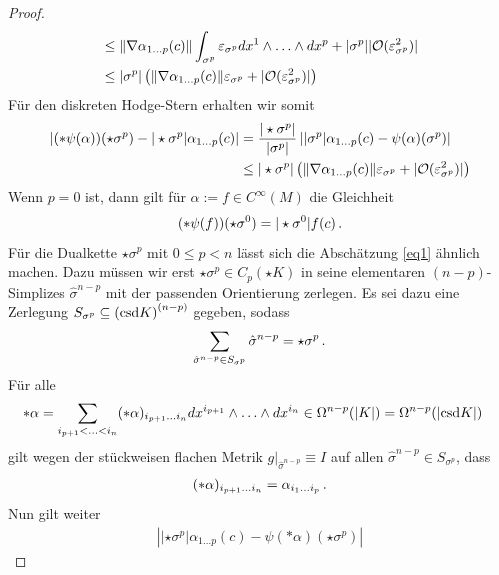 \begin{proof}
\begin{align}
      &\le \|\nabla\alpha_{1 \ldots p}(c)\| \int_{\sigma^{p}} \varepsilon_{\sigma^{p}}  dx^{1}\wedge\ldots\wedge dx^{p} +|\sigma^{p}| |\mathcal{O}(\varepsilon_{\sigma^{p}}^{2})| \\
      &\le |\sigma^{p}| \left( \|\nabla\alpha_{1 \ldots p}(c)\| \varepsilon_{\sigma^{p}} + |\mathcal{O}(\varepsilon_{\sigma^{p}}^{2})| \right) \label{eq1}
    \end{align}
    Für den diskreten Hodge-Stern erhalten wir somit
    \begin{align}
      \left| (*\psi(\alpha))(\star\sigma^{p}) - |\star\sigma^{p}|\alpha_{1 \ldots p}(c) \right|
            &= \frac{|\star\sigma^{p}|}{|\sigma^{p}|} \left| |\sigma^{p}|\alpha_{1 \ldots p}(c) - \psi(\alpha)(\sigma^{p}) \right| \\
            &\le  |\star\sigma^{p}| \left( \|\nabla\alpha_{1 \ldots p}(c)\| \varepsilon_{\sigma^{p}} + |\mathcal{O}(\varepsilon_{\sigma^{p}}^{2})| \right)
    \end{align}
    Wenn \( p = 0 \) ist, dann gilt für \( \alpha:= f \in C^{\infty}(M) \) die Gleichheit
    \begin{align}
      (*\psi(f))(\star\sigma^{0}) = |\star\sigma^{0}|f(c) \,\text{.}
    \end{align}
    Für die Dualkette \( \star\sigma^{p} \) mit \( 0\le p < n \) lässt sich die Abschätzung \eqref{eq1} ähnlich machen.
    Dazu müssen wir erst \( \star\sigma^{p}\in C_{p}(\star K) \) in seine elementaren \( (n-p) \)-Simplizes \( \hat\sigma^{n-p} \) mit der passenden Orientierung zerlegen.
    Es sei dazu eine Zerlegung \(  S_{\sigma^{p}} \subseteq \left( \text{csd} K \right)^{(n-p)} \) gegeben, sodass
    \begin{align}
      \sum_{\hat\sigma^{n-p} \in S_{\sigma^{p}}} \hat\sigma^{n-p} = \star\sigma^{p}
      \,\text{.}
    \end{align}
    Für alle
    \begin{align}
      *\alpha&= \sum_{i_{p+1}<\ldots<i_{n}} (*\alpha)_{i_{p+1}\ldots i_{n}} dx^{i_{p+1}}\wedge\ldots\wedge dx^{i_{n}} \in\Omega^{n-p}(|K|)=\Omega^{n-p}(|\text{csd} K|)
    \end{align}
    gilt wegen der stückweisen flachen Metrik \( g|_{\hat\sigma^{n-p}} \equiv I \) auf allen \( \hat\sigma^{n-p} \in S_{\sigma^{p}} \), dass
    \begin{align}
      (*\alpha)_{i_{p+1}\ldots i_{n}} = \alpha_{i_{1}\ldots i_{p}} \,\text{.}
    \end{align}
    Nun gilt weiter
    \begin{align}
      \left| |\star\sigma^{p}|\alpha_{1 \ldots p}(c) - \psi(*\alpha)(\star\sigma^{p})\right| 

\end{align}
\end{proof}
